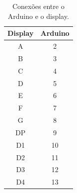 \documentclass[12pt]{article}
\begin{document}
\begin{table}[H]
	\centering
	\begin{tabular}{|c|c|}
	\hline
	\textbf{Display} & \textbf{Arduino} \\ \hline
	A                & 2                \\ \hline
	B                & 3                \\ \hline
	C                & 4                \\ \hline
	D                & 5                \\ \hline
	E                & 6                \\ \hline
	F                & 7                \\ \hline
	G                & 8                \\ \hline
	DP               & 9                \\ \hline
	D1               & 10               \\ \hline
	D2               & 11               \\ \hline
	D3               & 12               \\ \hline
	D4               & 13               \\ \hline
	\end{tabular}
	\caption{Conexões entre o Arduino e o display.}
	\label{tabSensorTemp}
\end{table}



\end{document}
